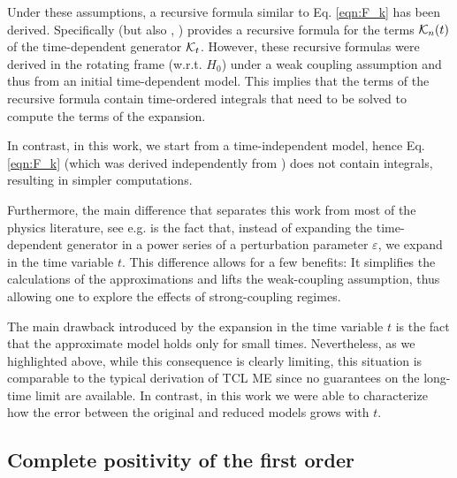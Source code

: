 \documentclass[10pt,aps,pra,twocolumn,showpacs,superscriptaddress,nobalancelastpage,notitlepage,nofootinbib,longbibliography]{revtex4-2}
\begin{document}
Under these assumptions, a recursive formula similar to Eq. \eqref{eqn:F_k} has been derived.  
Specifically \cite[Eq. (38)]{nestmann2019time} (but also \cite[Eq. (2)]{cerrillo2014non} \cite[Eq. (2)]{cygorek2025timenonlocalversustimelocallongtime}, \cite[Eq. (16)]{gasbarri2018recursive}) provides a recursive formula for the terms $\mathcal{K}_n(t)$ of the time-dependent generator $\mathcal{K}_t$. However, these recursive formulas were derived in the rotating frame (w.r.t. $H_0$) under a weak coupling assumption and thus from an initial time-dependent model. This implies that the terms of the recursive formula contain time-ordered integrals that need to be solved to compute the terms of the expansion. 

In contrast, in this work, we start from a time-independent model, hence Eq. \eqref{eqn:F_k} (which was derived independently from \cite{nestmann2019time,cerrillo2014non,cygorek2025timenonlocalversustimelocallongtime,gasbarri2018recursive}) does not contain integrals, resulting in simpler computations.

Furthermore, the main difference that separates this work from most of the physics literature, see e.g. \cite{colla2025unveiling,colla2025recursive,Tokieda_2025} is the fact that, instead of expanding the time-dependent generator in a power series of a perturbation parameter $\varepsilon$, we expand in the time variable $t$. This difference allows for a few benefits: It simplifies the calculations of the approximations and lifts the weak-coupling assumption, thus allowing one to explore the effects of strong-coupling regimes. 

The main drawback introduced by the expansion in the time variable $t$ is the fact that the approximate model holds only for small times. Nevertheless, as we highlighted above, while this consequence is clearly limiting, this situation is comparable to the typical derivation of TCL ME since no guarantees on the long-time limit are available. In contrast, in this work we were able to characterize how the error between the original and reduced models grows with $t$.  

\subsection{Complete positivity of the first order}
\label{sec:cptp_first_order}
\end{document}
